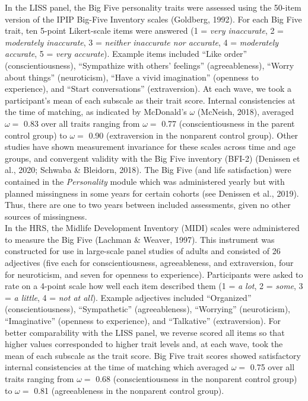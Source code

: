 \documentclass[
  english,
  man, noextraspace]{apa7}
\begin{document}
In the LISS panel, the Big Five personality traits were assessed using the 50-item version of the IPIP Big-Five Inventory scales (Goldberg, 1992). For each Big Five trait, ten 5-point Likert-scale items were answered (1 = \emph{very inaccurate}, 2 = \emph{moderately inaccurate}, 3 = \emph{neither inaccurate nor accurate}, 4 = \emph{moderately accurate}, 5 = \emph{very accurate}). Example items included \enquote{Like order} (conscientiousness), \enquote{Sympathize with others' feelings} (agreeableness), \enquote{Worry about things} (neuroticism), \enquote{Have a vivid imagination} (openness to experience), and \enquote{Start conversations} (extraversion). At each wave, we took a participant's mean of each subscale as their trait score. Internal consistencies at the time of matching, as indicated by McDonald's \(\omega\) (McNeish, 2018), averaged \(\omega =\) 0.83 over all traits ranging from \(\omega =\) 0.77 (conscientiousness in the parent control group) to \(\omega =\) 0.90 (extraversion in the nonparent control group). Other studies have shown measurement invariance for these scales across time and age groups, and convergent validity with the Big Five inventory (BFI-2) (Denissen et al., 2020; Schwaba \& Bleidorn, 2018). The Big Five (and life satisfaction) were contained in the \emph{Personality} module which was administered yearly but with planned missingness in some years for certain cohorts (see Denissen et al., 2019). Thus, there are one to two years between included assessments, given no other sources of missingness.\\
In the HRS, the Midlife Development Inventory (MIDI) scales were administered to measure the Big Five (Lachman \& Weaver, 1997). This instrument was constructed for use in large-scale panel studies of adults and consisted of 26 adjectives (five each for conscientiousness, agreeableness, and extraversion, four for neuroticism, and seven for openness to experience). Participants were asked to rate on a 4-point scale how well each item described them (1 = \emph{a lot}, 2 = \emph{some}, 3 = \emph{a little}, 4 = \emph{not at all}). Example adjectives included \enquote{Organized} (conscientiousness), \enquote{Sympathetic} (agreeableness), \enquote{Worrying} (neuroticism), \enquote{Imaginative} (openness to experience), and \enquote{Talkative} (extraversion). For better comparability with the LISS panel, we reverse scored all items so that higher values corresponded to higher trait levels and, at each wave, took the mean of each subscale as the trait score. Big Five trait scores showed satisfactory internal consistencies at the time of matching which averaged \(\omega =\) 0.75 over all traits ranging from \(\omega =\) 0.68 (conscientiousness in the nonparent control group) to \(\omega =\) 0.81 (agreeableness in the nonparent control group).
\end{document}
